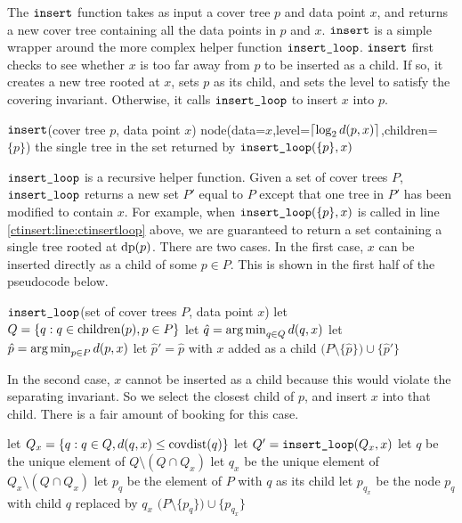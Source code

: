 \documentclass[../main.tex]{subfiles}
\newcommand{\dist}[2]{\distf({#1},{#2})}
\newcommand{\distf}{d}
\newcommand{\mkfunction}[1]{\ifmmode{\text{{#1}}}}
\newcommand{\level}[1]      {\mkfunction{level}({#1})}
\newcommand{\children}[1]   {\mkfunction{children}({#1})}
\newcommand{\covdist}[1]    {\mkfunction{covdist}({#1})}
\newcommand{\data}[1]         {\mkfunction{dp}({#1})}
\newcommand{\ctinsert}{\ensuremath{\textnormal{\ttfamily insert}}}
\newcommand{\ctinsertloop}{\ensuremath{\textnormal{\ttfamily insert\_loop}}}
\begin{document}
The $\ctinsert$ function takes as input a cover tree $p$ and data point $x$,
and returns a new cover tree containing all the data points in $p$ and $x$.
$\ctinsert$ is a simple wrapper around the more complex helper function $\ctinsertloop$.
$\ctinsert$ first checks to see whether $x$ is too far away from $p$ to be inserted as a child.
If so, it creates a new tree rooted at $x$,
sets $p$ as its child,
and sets the level to satisfy the covering invariant.
Otherwise, it calls $\ctinsertloop$ to insert $x$ into $p$.
\begin{pseudocode}{\ctinsert(cover tree $p$, data point $x$)}
    \If {$\dist{p}{x} > \covdist{p}$}
        \State \Return node(data=$x$,level=$\ceil{\log_2 \dist{p}{x}}$,children=$\{p\}$)
    \Else
        \State \Return the single tree in the set returned by $\ctinsertloop(\{p\},x)$
        \label{ctinsert:line:ctinsertloop}
    \EndIf
\end{pseudocode}
\noindent
$\ctinsertloop$ is a recursive helper function. 
Given a set of cover trees $P$, 
$\ctinsertloop$ returns a new set $P'$ equal to $P$ except that one tree in $P'$ has been modified to contain $x$.
For example, when $\ctinsertloop(\{p\},x)$ is called in line \ref{ctinsert:line:ctinsertloop} above,
we are guaranteed to return a set containing a single tree rooted at $\data{p}$.
There are two cases.
In the first case, $x$ can be inserted directly as a child of some $p\in P$.
This is shown in the first half of the pseudocode below.
\begin{pseudocode}{\ctinsertloop(set of cover trees $P$, data point $x$)}
    \State let $Q = \{ q : q \in \children{p}, p\in P\}$
    \State let $\hat q = \argmin_{q\in Q} \dist{q}{x}$
    \If {$\dist{\hat q}{x} \ge \covdist{\hat q}$}
        \State let $\hat p = \argmin_{p\in P} \dist{p}{x}$
        \State let $\hat p' = \hat p$ with $x$ added as a child
        \State \Return $\big(P\setminus\{\hat p\}\big) \cup \{\hat p'\}$
\end{pseudocode}
\noindent
In the second case, $x$ cannot be inserted as a child because this would violate the separating invariant.
So we select the closest child of $p$, and insert $x$ into that child.
There is a fair amount of booking for this case.
\begin{pseudocode*}
    \Else
        \State let $Q_x = \{q : q\in Q, \dist{q}{x} \le \covdist{q}\}$
        \State let $Q' = \ctinsertloop(Q_x, x)$
        \State let $q$   be the unique element of $Q  \setminus(Q\cap Q_x)$
        \State let $q_x$ be the unique element of $Q_x\setminus(Q\cap Q_x)$
        \State let $p_q$ be the element of $P$ with $q$ as its child
        \State let $p_{q_x}$ be the node $p_q$ with child $q$ replaced by $q_x$
        \State \Return $\big(P\setminus\{p_q\}\big) \cup \{p_{q_x}\}$
    \EndIf
\end{pseudocode*}
\end{document}

